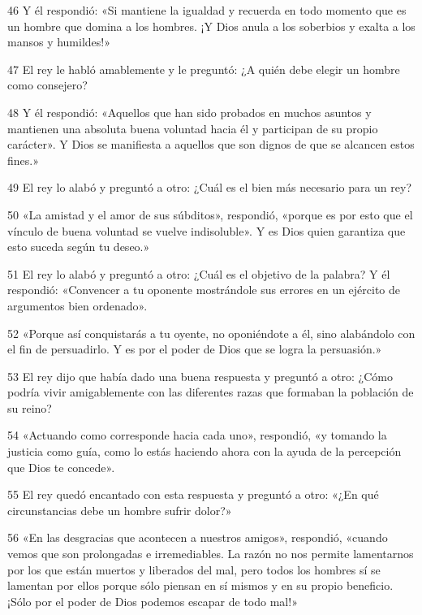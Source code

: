 \par 46 Y él respondió: «Si mantiene la igualdad y recuerda en todo momento que es un hombre que domina a los hombres. ¡Y Dios anula a los soberbios y exalta a los mansos y humildes!»

\par 47 El rey le habló amablemente y le preguntó: ¿A quién debe elegir un hombre como consejero?

\par 48 Y él respondió: «Aquellos que han sido probados en muchos asuntos y mantienen una absoluta buena voluntad hacia él y participan de su propio carácter». Y Dios se manifiesta a aquellos que son dignos de que se alcancen estos fines.»

\par 49 El rey lo alabó y preguntó a otro: ¿Cuál es el bien más necesario para un rey?

\par 50 «La amistad y el amor de sus súbditos», respondió, «porque es por esto que el vínculo de buena voluntad se vuelve indisoluble». Y es Dios quien garantiza que esto suceda según tu deseo.»

\par 51 El rey lo alabó y preguntó a otro: ¿Cuál es el objetivo de la palabra? Y él respondió: «Convencer a tu oponente mostrándole sus errores en un ejército de argumentos bien ordenado».

\par 52 «Porque así conquistarás a tu oyente, no oponiéndote a él, sino alabándolo con el fin de persuadirlo. Y es por el poder de Dios que se logra la persuasión.»

\par 53 El rey dijo que había dado una buena respuesta y preguntó a otro: ¿Cómo podría vivir amigablemente con las diferentes razas que formaban la población de su reino?

\par 54 «Actuando como corresponde hacia cada uno», respondió, «y tomando la justicia como guía, como lo estás haciendo ahora con la ayuda de la percepción que Dios te concede».

\par 55 El rey quedó encantado con esta respuesta y preguntó a otro: «¿En qué circunstancias debe un hombre sufrir dolor?»

\par 56 «En las desgracias que acontecen a nuestros amigos», respondió, «cuando vemos que son prolongadas e irremediables. La razón no nos permite lamentarnos por los que están muertos y liberados del mal, pero todos los hombres sí se lamentan por ellos porque sólo piensan en sí mismos y en su propio beneficio. ¡Sólo por el poder de Dios podemos escapar de todo mal!»

